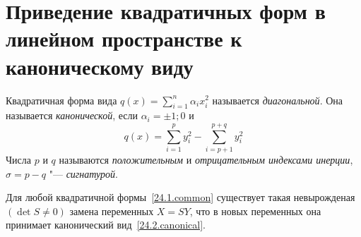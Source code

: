 \section{Приведение квадратичных форм в линейном пространстве к каноническому виду}
\begin{defn}
Квадратичная форма вида $q(x)=\sum\limits_{i=1}^n\alpha_ix_i^2$ называется \textit{диагональной}. Она называется \textit{канонической}, если $\alpha_i=\pm 1;0$ и 
\begin{equation}\label{24.2.canonical}
q(x)=\sum\limits_{i=1}^py_i^2-\sum\limits_{i=p+1}^{p+q}y_i^2
\end{equation} 
Числа $p$ и $q$ называются \textit{положительным} и \textit{отрицательным индексами инерции}, $\sigma=p-q$ "--- \textit{сигнатурой}.
\end{defn}
\begin{thm}
Для любой квадратичной формы~\eqref{24.1.common} существует такая невырожденая $(\det S \neq 0)$ замена переменных $X=SY$, что в новых переменных она принимает канонический вид~\eqref{24.2.canonical}.
\end{thm}
